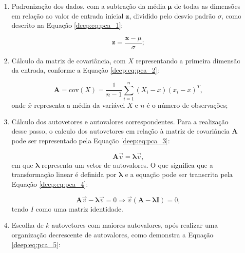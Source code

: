 \begin{enumerate}
    \item Padronização dos dados, com a subtração da média $\boldsymbol{\mu}$ de todas as dimensões em relação ao valor de entrada inicial $\boldsymbol{z}$, dividido pelo desvio padrão $\sigma$, como descrito na Equação \ref{deep:eq:pca_1}:

    \begin{equation}
        \label{deep:eq:pca_1}
        \boldsymbol{z} = \frac{\boldsymbol{x} - \mu}{\sigma};
    \end{equation}

    \item Cálculo da matriz de covariância, com $X$ representando a primeira dimensão da entrada, conforme a Equação \ref{deep:eq:pca_2}:
    
    \begin{equation}
        \label{deep:eq:pca_2}
        \boldsymbol{A} = \text{cov}(X) = \frac{1}{n-1} \sum_{i=1}^{n} (X_i - \bar{x}) (x_i - \bar{x})^T,
    \end{equation}
    onde \(\bar{x}\) representa a média da variável $X$ e $n$ é o número de observações;

    \item Cálculo dos autovetores e autovalores correspondentes. Para a realização desse passo, o calculo dos autovetores em relação à matriz de covariância $\boldsymbol{A}$ pode ser representado pela Equação \ref{deep:eq:pca_3}:

    \begin{equation}
        \label{deep:eq:pca_3}
        \boldsymbol{A}\overrightarrow{v} = \boldsymbol{\lambda}\overrightarrow{v},
    \end{equation}
    em que $\boldsymbol{\lambda}$ representa um vetor de autovalores. O que significa que a transformação linear é definida por $\boldsymbol{\lambda}$ e a equação pode ser transcrita pela Equação \ref{deep:eq:pca_4}:

        \begin{equation}
        \label{deep:eq:pca_4}
        \boldsymbol{A}\overrightarrow{v} - \boldsymbol{\lambda}\overrightarrow{v} = 0
        \Rightarrow \overrightarrow{v}(\boldsymbol{A} - \boldsymbol{\lambda} \boldsymbol{I}) = 0,
    \end{equation}
    tendo $I$ como uma matriz identidade.

    \item Escolha de $k$ autovetores com maiores autovalores, após realizar uma organização decrescente de autovalores, como demonstra a Equação \ref{deep:eq:pca_5}:


\end{enumerate}
